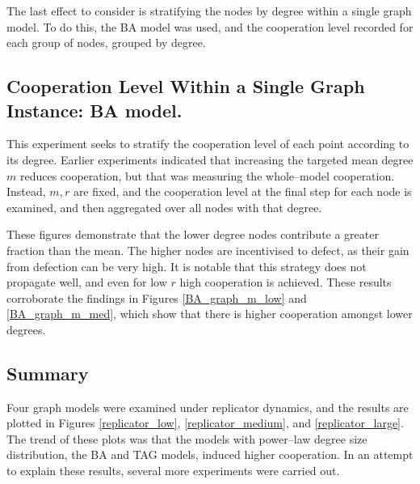 The last effect to consider is stratifying the nodes by degree within a single graph model. To do this, the BA model was used, and the cooperation level recorded for each group of nodes, grouped by degree. \\

\subsection{Cooperation Level Within a Single Graph Instance: BA model. }
This experiment seeks to stratify the cooperation level of each point according to its degree. Earlier experiments indicated that increasing the targeted mean degree $m$ reduces cooperation, but that was measuring the whole--model cooperation. Instead, $m, r$ are fixed, and the cooperation level at the final step for each node is examined, and then aggregated over all nodes with that degree. \\
\FloatBarrier
{}
\FloatBarrier

\FloatBarrier
{}
\FloatBarrier

These figures demonstrate that the lower degree nodes contribute a greater fraction than the mean. The higher nodes are incentivised to defect, as their gain from defection can be very high. It is notable that this strategy does not propagate well, and even for low $r$ high cooperation is achieved. These results corroborate the findings in Figures \ref{BA_graph_m_low} and \ref{BA_graph_m_med}, which show that there is higher cooperation amongst lower degrees. \\

\subsection{Summary}
Four graph models were examined under replicator dynamics, and the results are plotted in Figures \ref{replicator_low}, \ref{replicator_medium}, and \ref{replicator_large}. The trend of these plots was that the models with power--law degree size distribution, the BA and TAG models, induced higher cooperation. In an attempt to explain these results, several more experiments were carried out. \\

